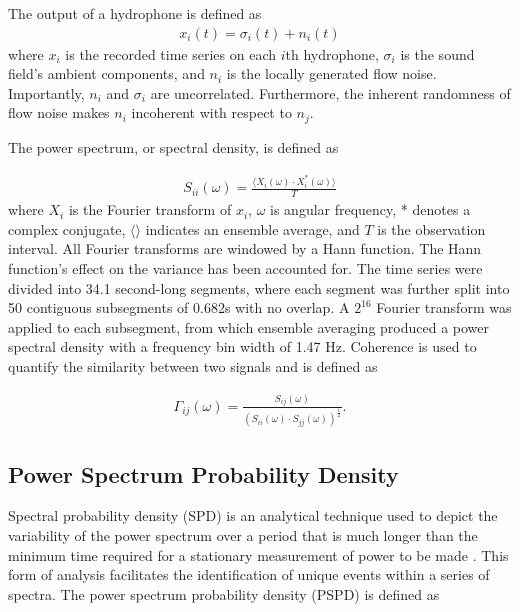 \documentclass[12pt,journal,onecolumn]{IEEEtran}
\begin{document}
The output of a hydrophone is defined as
\begin{align}
x_i(t) = \sigma_i(t) + n_i (t) 
\label{output}
\end{align}
where $x_i$ is the recorded time series on each $i$th hydrophone, $\sigma_i$ is the sound field's ambient components, and $n_i$ is the locally generated flow noise. Importantly, $n_i$ and $\sigma_i$ are uncorrelated. 
Furthermore, the inherent randomness of flow noise makes $n_i$ incoherent with  respect to $n_j$. 

The power spectrum, or spectral density, is defined as 

\begin{align}
S_{ii}(\omega) = \frac{\langle X_i(\omega)\cdot X_i^*(\omega) \rangle}{T}
\label{power}
\end{align}
where $X_i$ is the Fourier transform of $x_i$, $\omega$ is angular frequency, * denotes a complex conjugate, $\langle \rangle$ indicates an ensemble average, and $T$ is the observation interval. All Fourier transforms are windowed by a Hann function. The Hann function's effect on the variance has been accounted for. The time series were divided into 34.1 second-long segments, where each segment was further split into 50 contiguous subsegments of 0.682s with no overlap. A $2^{16}$ Fourier transform was applied to each subsegment, from which ensemble averaging produced a power spectral density with a frequency bin width of 1.47 Hz. Coherence is used to quantify the similarity between two signals and is defined as 

\begin{align}
\Gamma_{ij}(\omega) = \frac{S_{ij}(\omega)}{(S_{ii}(\omega) \cdot S_{jj}(\omega))^{\frac{1}{2}}}.
\label{coherence}
\end{align}



\subsection{Power Spectrum Probability Density}

Spectral probability density (SPD) is an analytical technique used to depict the variability of the power spectrum over a period that is much longer than the minimum time required for a stationary measurement of power to be made \cite{merchant}. This form of analysis facilitates the identification of unique events within a series of spectra. The power spectrum probability density (PSPD) is defined as
\end{document}

